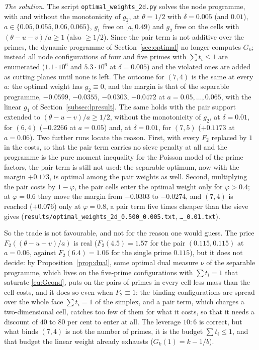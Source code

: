 \documentclass[11pt]{amsart}
\theoremstyle{remark}
\begin{document}
\emph{The solution.} The script \texttt{optimal\_weights\_2d.py} solves the node programme, with and without the monotonicity of $g_2$, at $\theta=1/2$ with $\delta=0.005$ (and $0.01$), $a\in\{0.05,0.055,0.06,0.065\}$, $g_1$ free on $[a,0.49)$ and $g_2$ free on the cells with $(\theta-u-v)/a\ge1$ (also $\ge1/2$). Since the pair term is not additive over the primes, the dynamic programme of Section~\ref{sec:optimal} no longer computes $G_k$; instead all node configurations of four and five primes with $\sum t_i\le1$ are enumerated ($1.1\cdot10^6$ and $5.3\cdot10^6$ at $\delta=0.005$) and the violated ones are added as cutting planes until none is left. The outcome for $(7,4)$ is the same at every $a$: the optimal weight has $g_2\equiv0$, and the margin is that of the separable programme, $-0.0599$, $-0.0355$, $-0.0303$, $-0.0472$ at $a=0.05,\dots,0.065$, with the linear $g_1$ of Section~\ref{subsec:lpresult}. The same holds with the pair support extended to $(\theta-u-v)/a\ge1/2$, without the monotonicity of $g_2$, at $\delta=0.01$, for $(6,4)$ ($-0.2266$ at $a=0.05$) and, at $\delta=0.01$, for $(7,5)$ ($+0.1173$ at $a=0.06$). Two further runs locate the reason. First, with every $F_2$ replaced by $1$ in the costs, so that the pair term carries no sieve penalty at all and the programme is the pure moment inequality for the Poisson model of the prime factors, the pair term is still not used: the separable optimum, now with the margin $+0.173$, is optimal among the pair weights as well. Second, multiplying the pair costs by $1-\varphi$, the pair cells enter the optimal weight only for $\varphi>0.4$; at $\varphi=0.6$ they move the margin from $-0.0303$ to $-0.0274$, and $(7,4)$ is reached ($+0.076$) only at $\varphi=0.8$, a pair term five times cheaper than the sieve gives (\texttt{results/optimal\_weights\_2d\_0.500\_0.005.txt}, \texttt{\dots\_0.01.txt}).

So the trade is not favourable, and not for the reason one would guess. The price $F_2((\theta-u-v)/a)$ is real ($F_2(4.5)=1.57$ for the pair $(0.115,0.115)$ at $a=0.06$, against $F_2(6.4)=1.06$ for the single prime $0.115$), but it does not decide: by Proposition~\ref{prop:dual}, some optimal dual measure $\nu$ of the separable programme, which lives on the five-prime configurations with $\sum t_i=1$ that saturate \eqref{eq:Gcond}, puts on the pairs of primes in every cell less mass than the cell costs, and it does so even when $F_2\equiv1$: the binding configurations are spread over the whole face $\sum t_i=1$ of the simplex, and a pair term, which charges a two-dimensional cell, catches too few of them for what it costs, so that it needs a discount of $40$ to $80$ per cent to enter at all. The leverage $10:6$ is correct, but what binds $(7,4)$ is not the number of primes, it is the budget $\sum t_i\le1$, and that budget the linear weight already exhausts ($G_k(1)=k-1/b$).
\end{document}
